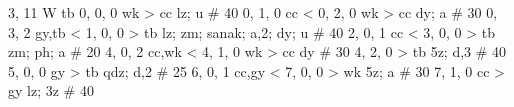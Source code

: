 %
3, 11 %
W %
tb
%
0, 0, 0
wk > cc
lz; u # 40
%
0, 1, 0
cc < 
%
0, 2, 0
wk > cc
dy; a # 30
%
0, 3, 2
gy,tb < 
%
1, 0, 0
 > tb
lz; zm; sanak; a,2; dy; u # 40
%
2, 0, 1
cc < 
%
3, 0, 0
 > tb
zm; ph; a # 20
%
4, 0, 2
cc,wk < 
%
4, 1, 0
wk > cc
dy # 30
%
4, 2, 0
 > tb
5z; d,3 # 40
%
5, 0, 0
gy > tb
qdz; d,2 # 25
%
6, 0, 1
cc,gy < 
%
7, 0, 0
 > wk
5z; a # 30
%
7, 1, 0
cc > gy
lz; 3z # 40